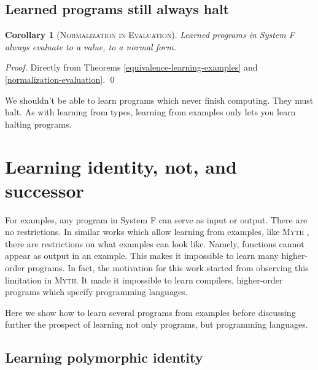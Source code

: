 \documentclass[acmsmall]{acmart}
\renewenvironment{proof}
    {\textit{Proof.}}
    {\qed\\}
\theoremstyle{mytheoremstyle}
\newtheorem{corollary}[theorem]{Corollary}
\begin{document}
\subsection{Learned programs still always halt}

\begin{corollary}[\textsc{Normalization in Evaluation}]
Learned programs in System F always evaluate to a value, to a normal form.
\label{normalization-learning}
\end{corollary}
\begin{proof}
Directly from Theorems \ref{equivalence-learning-examples} and \ref{normalization-evaluation}. 
\end{proof}
\vspace{-.8em}

We shouldn't be able to learn programs which never finish computing. They must halt. As with learning from types, learning from examples only lets you learn halting programs.

\section{Learning identity, not, and successor}

For examples, any program in System F can serve as input or output. There are no restrictions. In similar works which allow learning from examples, like \textsc{Myth} \cite{osera2015program}, there are restrictions on what examples can look like. Namely, functions cannot appear as output in an example. This makes it impossible to learn many higher-order programs. In fact, the motivation for this work started from observing this limitation in \textsc{Myth}. It made it impossible to learn compilers, higher-order programs which specify programming languages. 

Here we show how to learn several programs from examples before discussing further the prospect of learning not only programs, but programming languages.

\subsection{Learning polymorphic identity}
\end{document}
